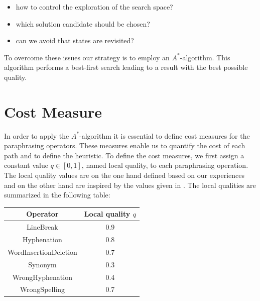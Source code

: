 \documentclass[11pt]{reportAlternative}
\begin{document}
\begin{itemize}

\item  how to control the exploration of the search space?

\item which solution candidate should be chosen?

\item can we avoid that states are revisited?

\end{itemize}

To overcome these issues our strategy is to employ an $A^*$-algorithm. This algorithm performs a best-first search leading to a result with the best possible quality.  



\section{Cost Measure}

In order to apply the $A^*$-algorithm it is essential to define cost measures for the paraphrasing operators. These measures enable us to quantify the cost of each path and to define the heuristic. To define the cost measures, we first assign a constant value $q\in [0,1]$, named local quality, to each paraphrasing operation. The local quality values are on the one hand defined based on our experiences and on the other hand are inspired by the values given in \cite{Stein}. The local qualities are summarized in the following table:


\begin{center}

\begin{tabular}{|c|c|}\hline
   Operator           & Local quality $q$ \\ \hline
   LineBreak          & 0.9 \\ \hline
   Hyphenation        & 0.8 \\ \hline
   WordInsertionDeletion    & 0.7 \\ \hline
   Synonym            & 0.3 \\ \hline
   WrongHyphenation   & 0.4 \\ \hline
   WrongSpelling      & 0.7 \\ \hline
\end{tabular}

\end{center}
\end{document}
